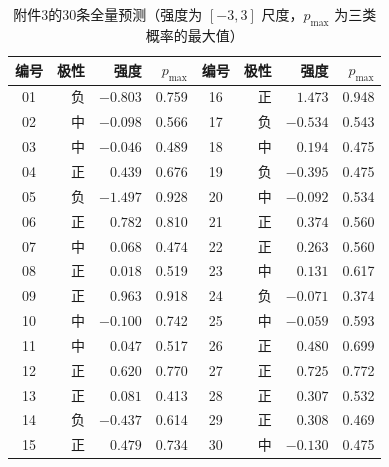 \begin{table}[H]
\centering
\caption{附件3的30条全量预测（强度为 $[-3,3]$ 尺度，$p_{\max}$ 为三类概率的最大值）}\label{tab:appB}
\begin{tabular}{crrr@{\hspace{2.2em}}crrr}
\toprule
编号 & 极性 & 强度 & $p_{\max}$ & 编号 & 极性 & 强度 & $p_{\max}$ \\
\midrule
01 & 负 & $-0.803$ & 0.759 & 16 & 正 & $1.473$ & 0.948 \\
02 & 中 & $-0.098$ & 0.566 & 17 & 负 & $-0.534$ & 0.543 \\
03 & 中 & $-0.046$ & 0.489 & 18 & 中 & $0.194$ & 0.475 \\
04 & 正 & $0.439$ & 0.676 & 19 & 负 & $-0.395$ & 0.475 \\
05 & 负 & $-1.497$ & 0.928 & 20 & 中 & $-0.092$ & 0.534 \\
06 & 正 & $0.782$ & 0.810 & 21 & 正 & $0.374$ & 0.560 \\
07 & 中 & $0.068$ & 0.474 & 22 & 正 & $0.263$ & 0.560 \\
08 & 正 & $0.018$ & 0.519 & 23 & 中 & $0.131$ & 0.617 \\
09 & 正 & $0.963$ & 0.918 & 24 & 负 & $-0.071$ & 0.374 \\
10 & 中 & $-0.100$ & 0.742 & 25 & 中 & $-0.059$ & 0.593 \\
11 & 中 & $0.047$ & 0.517 & 26 & 正 & $0.480$ & 0.699 \\
12 & 正 & $0.620$ & 0.770 & 27 & 正 & $0.725$ & 0.772 \\
13 & 正 & $0.081$ & 0.413 & 28 & 正 & $0.307$ & 0.532 \\
14 & 负 & $-0.437$ & 0.614 & 29 & 正 & $0.308$ & 0.469 \\
15 & 正 & $0.479$ & 0.734 & 30 & 中 & $-0.130$ & 0.475 \\
\bottomrule
\end{tabular}
\end{table}
